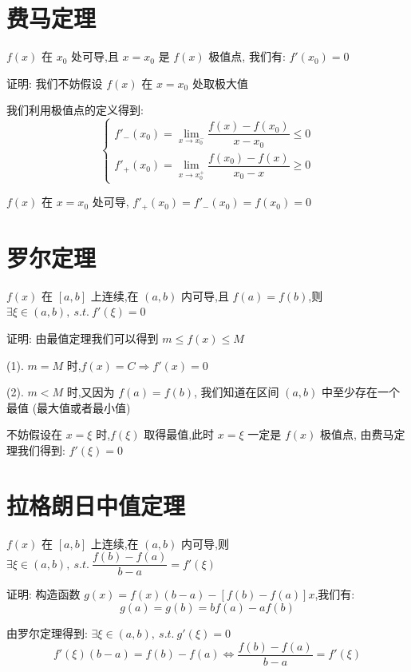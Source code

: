 \section{费马定理}
\begin{theorem}[费马定理]

	$f(x)$ 在 $x_{0}$ 处可导,且 $x=x_{0}$ 是 $f(x)$ 极值点, 我们有: $f'(x_{0})=0$

	证明: 我们不妨假设 $f(x)$ 在 $x=x_{0}$ 处取极大值

	我们利用极值点的定义得到:
	$$ \left\lbrace
		\begin{array}{l}
			f'_{-}(x_{0})=\lim\limits_{x\rightarrow x_{0}^{-}}\dfrac{f(x)-f(x_{0})}{x-x_{0}}\leq 0 \\
			f'_{+}(x_{0})=\lim\limits_{x\rightarrow x_{0}^{+}}\dfrac{f(x_{0})-f(x)}{x_{0}-x}\geq 0
		\end{array}
		\right. $$

	$f(x)$ 在 $x=x_{0}$ 处可导, $f'_{+}(x_{0})=f'_{-}(x_{0})=f(x_{0})=0$
\end{theorem}
\section{罗尔定理}
\begin{theorem}[罗尔定理]

	$f(x)$ 在 $[a,b]$ 上连续,在 $(a,b)$ 内可导,且 $f(a)=f(b)$,则 $\exists \xi\in(a,b),\ s.t.\ f'(\xi)=0$

	证明: 由最值定理我们可以得到 $m\leq f(x)\leq M$

	(1). $m=M$ 时,$f(x) = C \Rightarrow f'(x)=0$

	(2). $m<M$ 时,又因为 $f(a)=f(b)$, 我们知道在区间 $(a,b)$ 中至少存在一个最值 (最大值或者最小值)

	不妨假设在 $x=\xi$ 时,$f(\xi)$ 取得最值,此时 $x=\xi$ 一定是 $f(x)$ 极值点, 由费马定理我们得到: $f'(\xi)=0$

\end{theorem}
\section{拉格朗日中值定理}
\begin{theorem}[拉格朗日中值定理]

	$f(x)$ 在 $[a,b]$ 上连续,在 $(a,b)$ 内可导,则 $\exists \xi\in(a,b),\ s.t.\ \dfrac{f(b)-f(a)}{b-a}=f'(\xi)$

	证明: 构造函数 $g(x)=f(x)(b-a)-[f(b)-f(a)]x$,我们有:
	$$g(a)=g(b)=bf(a)-af(b)$$

	由罗尔定理得到:
	$\exists \xi\in(a,b),\ s.t.\ g'(\xi)=0$
	$$ f'(\xi)(b-a)=f(b)-f(a)\Leftrightarrow  \frac{f(b)-f(a)}{b-a}=f'(\xi)$$
\end{theorem}
